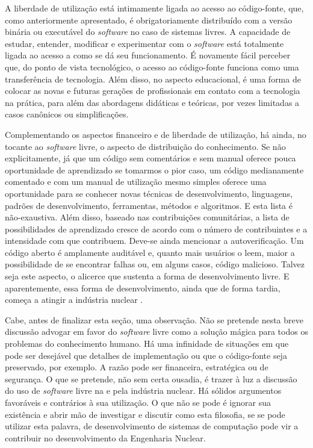 A liberdade de utilização está intimamente ligada ao acesso ao código-fonte, que, como anteriormente apresentado,
é obrigatoriamente distribuído com a versão binária ou executável do \textit{software} no caso de sistemas
livres. A capacidade de estudar, entender, modificar e experimentar
com o \textit{software} está totalmente ligada ao acesso a como se dá seu funcionamento. É novamente fácil perceber que,
do ponto de vista tecnológico, o acesso ao código-fonte funciona como uma transferência de tecnologia. Além disso, no
aspecto educacional, é uma forma de colocar as novas e futuras gerações de profissionais em contato com a tecnologia na
prática, para além das abordagens didáticas e teóricas, por vezes limitadas a casos canônicos ou simplificações. 



Complementando os aspectos financeiro e de liberdade de utilização, há ainda, no tocante ao \textit{software} livre,
o aspecto de distribuição do conhecimento. Se não explicitamente, já que um código sem comentários e sem manual oferece
pouca oportunidade de aprendizado se tomarmos o pior caso, um código medianamente comentado e com um manual de utilização mesmo
simples oferece uma oportunidade para se conhecer novas técnicas de desenvolvimento, linguagens, padrões de desenvolvimento, ferramentas,
métodos e algoritmos. E esta lista é não-exaustiva. Além disso, baseado nas contribuições comunitárias, a lista de possibilidades
de aprendizado cresce de acordo com o número de contribuintes e a intensidade com que contribuem. Deve-se ainda mencionar
a autoverificação. Um código aberto é amplamente auditável e, quanto mais usuários o leem, maior a possibilidade de se
encontrar falhas ou, em alguns casos, código malicioso. Talvez seja este aspecto, o alicerce que sustenta a forma de desenvolvimento
livre. E aparentemente, essa forma de desenvolvimento, ainda que de forma tardia, começa a atingir a indústria nuclear
\cite{Romano2013, Boyd2014, Theler2014b, Huff2016}.


Cabe, antes de finalizar esta seção, uma observação. Não se pretende nesta breve discussão advogar em favor do \textit{software}
livre como a solução mágica para todos os problemas do conhecimento humano. Há uma infinidade de situações em que pode ser desejável
que detalhes de implementação ou que o código-fonte seja preservado, por exemplo. A razão pode ser financeira, estratégica ou de segurança.
O que se pretende, não sem certa ousadia, é trazer à luz a discussão do uso de \textit{software} livre na e pela indústria nuclear. Há sólidos
argumentos favoráveis e contrários à sua utilização. O que não se pode é ignorar sua existência e abrir mão de investigar e discutir como
esta filosofia, se se pode utilizar esta palavra, de desenvolvimento de sistemas de computação pode vir a contribuir no desenvolvimento
da Engenharia Nuclear.

